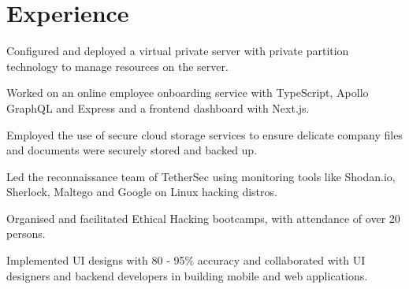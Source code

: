 \documentclass[]{openfont}
\begin{document}
%
%

%
%


\begin{minipage}[t]{0.66\textwidth} 

\section{Experience}
\vspace{\topsep}
\begin{tightemize}
\item Configured and deployed a virtual private server with private partition technology to manage resources on the server.
\item Worked on an online employee onboarding service with TypeScript, Apollo GraphQL and Express and a frontend dashboard with Next.js.
\item Employed the use of secure cloud storage services to ensure delicate company files and documents were securely stored and backed up.
\end{tightemize}
\sectionsep

\vspace{\topsep}
\begin{tightemize}
\item Led the reconnaissance team of TetherSec using monitoring tools like Shodan.io, Sherlock, Maltego and Google on Linux hacking distros.
\item Organised and facilitated Ethical Hacking bootcamps, with attendance of over 20 persons. 
\item Implemented UI designs with 80 - 95\% accuracy and collaborated with UI designers and backend developers in building mobile and web applications.
\end{tightemize}
\sectionsep


\end{minipage}
\end{document}
